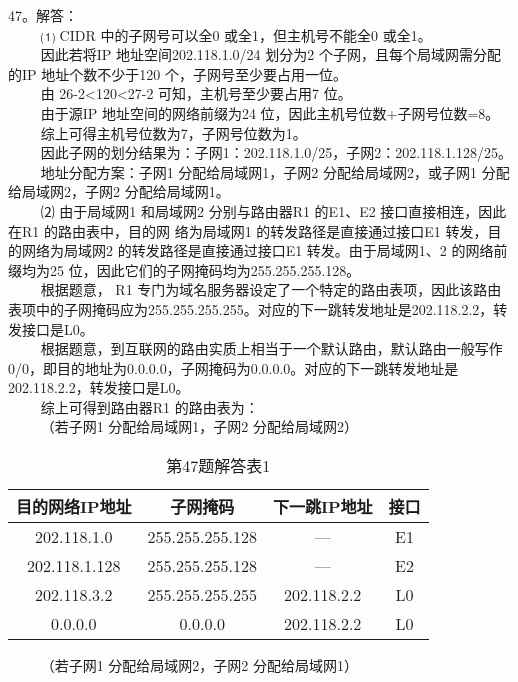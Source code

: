 47。解答： \\
$\qquad$ ⑴ CIDR 中的子网号可以全0 或全1，但主机号不能全0 或全1。 \\
$\qquad$ 因此若将IP 地址空间202.118.1.0/24 划分为2 个子网，且每个局域网需分配的IP 地址个数不少于120 个，子网号至少要占用一位。 \\
$\qquad$ 由 26-2<120<27-2 可知，主机号至少要占用7 位。 \\
$\qquad$ 由于源IP 地址空间的网络前缀为24 位，因此主机号位数+子网号位数=8。 \\
$\qquad$ 综上可得主机号位数为7，子网号位数为1。 \\
$\qquad$ 因此子网的划分结果为：子网1：202.118.1.0/25，子网2：202.118.1.128/25。 \\
$\qquad$ 地址分配方案：子网1 分配给局域网1，子网2 分配给局域网2，或子网1 分配给局域网2，子网2 分配给局域网1。 \\
$\qquad$ ⑵ 由于局域网1 和局域网2 分别与路由器R1 的E1、E2 接口直接相连，因此在R1 的路由表中，目的网
络为局域网1 的转发路径是直接通过接口E1 转发，目的网络为局域网2 的转发路径是直接通过接口E1 转发。由于局域网1、2 的网络前缀均为25 位，因此它们的子网掩码均为255.255.255.128。 \\
$\qquad$ 根据题意， R1 专门为域名服务器设定了一个特定的路由表项，因此该路由表项中的子网掩码应为255.255.255.255。对应的下一跳转发地址是202.118.2.2，转发接口是L0。  \\
$\qquad$ 根据题意，到互联网的路由实质上相当于一个默认路由，默认路由一般写作0/0，即目的地址为0.0.0.0，子网掩码为0.0.0.0。对应的下一跳转发地址是202.118.2.2，转发接口是L0。 \\
$\qquad$ 综上可得到路由器R1 的路由表为： \\
$\qquad$ （若子网1 分配给局域网1，子网2 分配给局域网2）
\begin{table}[ht]
\centering
\caption{第47题解答表1}\label{CSN09_tab8}
\begin{tabular}{|c|c|c|c|}
\hline
目的网络IP地址 & 子网掩码 & 下一跳IP地址 & 接口 \\
\hline
202.118.1.0 & 255.255.255.128 & — & E1 \\
\hline
202.118.1.128 & 255.255.255.128 & — & E2 \\
\hline
202.118.3.2 & 255.255.255.255 & 202.118.2.2 & L0 \\
\hline
0.0.0.0 & 0.0.0.0 & 202.118.2.2 & L0 \\
\hline
\end{tabular}
\end{table}
$\qquad$ （若子网1 分配给局域网2，子网2 分配给局域网1） \\
